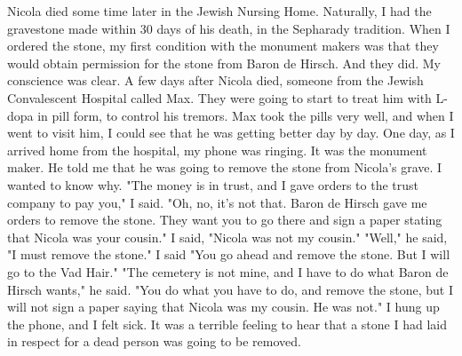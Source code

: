 Nicola died some time later in the Jewish Nursing Home. Naturally, I had the gravestone made within 30 days of 
his death, in the Sepharady tradition. When I ordered the stone, 
my first condition with the monument makers was that they would obtain permission for the stone from Baron de Hirsch. And they did. 
My conscience was clear. 
A few days after Nicola died, someone from the Jewish Convalescent Hospital called Max. They were going to start to treat him with 
L-dopa in pill form, to control his tremors. Max took the pills 
very well, and when I went to visit him, I could see that he was getting better day by day. 
One day, as I arrived home from the hospital, my phone was ringing. It was the monument maker. He told me that he was going to remove the stone from Nicola's grave. I wanted to know why. 
"The money is in trust, and I gave orders to the trust company 
to pay you," I said. 
"Oh, no, it's not that. Baron de Hirsch gave me orders to remove the stone. They want you to go there and sign a paper stating 
that Nicola was your cousin." 
I said, "Nicola was not my cousin." 
"Well," he said, "I must remove the stone." 
I said "You go ahead and remove the stone. But I will go to 
the Vad Hair." 
"The cemetery is not mine, and I have to do what Baron de Hirsch 
wants," he said. 
"You do what you have to do, and remove the stone, but I will 
not sign a paper saying that Nicola was my cousin. He was not." 
I hung up the phone, and I felt sick. It was a terrible feeling 
to hear that a stone I had laid in respect for a dead person was 
going to be removed. 

